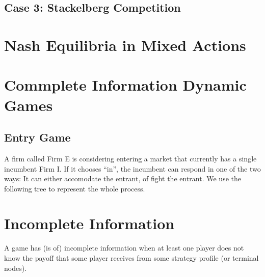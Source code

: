 \documentclass[12pt, oneside]{article}
\begin{document}
\subsection{Case 3: Stackelberg Competition}
\newpage
\section{Nash Equilibria in Mixed Actions}
\section{Commplete Information Dynamic Games}
\subsection{Entry Game}
A firm called Firm E is considering entering a market that currently has a single incumbent Firm I. If it chooses “in”, the incumbent can respond in one of the two ways: It can either accomodate the entrant, of fight the entrant. We use the following tree to represent the whole process.



\section{Incomplete Information}
A game has (is of) incomplete information when at least one player does not know the payoff that some player receives from some strategy profile (or terminal nodes).
\end{document}
